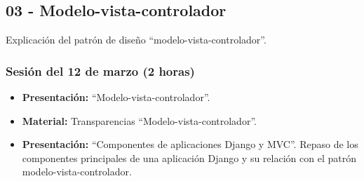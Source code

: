 \documentclass[a4paper,12pt]{article}
\begin{document}


\subsection{03 - Modelo-vista-controlador}

Explicación del patrón de diseño ``modelo-vista-controlador''.

\subsubsection{Sesión del 12 de marzo (2 horas)}

\begin{itemize}
\item \textbf{Presentación:} ``Modelo-vista-controlador''.
\item \textbf{Material:} Transparencias ``Modelo-vista-controlador''.
\item \textbf{Presentación:} ``Componentes de aplicaciones Django y MVC''.
 Repaso de los componentes principales de una aplicación Django y su relación con el patrón modelo-vista-controlador.
\end{itemize}

\end{document}
